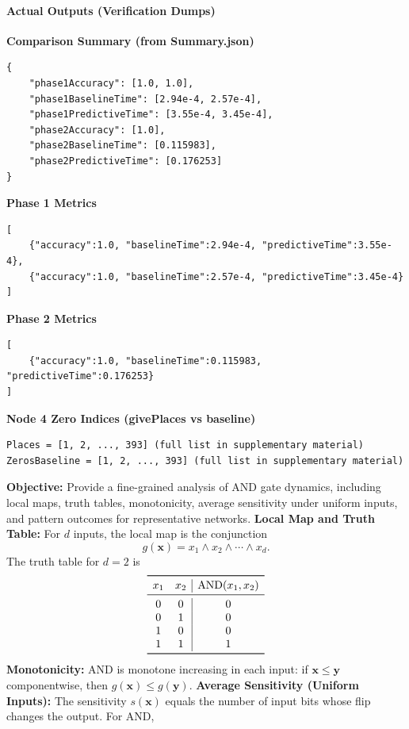 \paragraph{Actual Outputs (Verification Dumps)}
\textbf{Comparison Summary (from Summary.json)}
\begin{lstlisting}[language={},caption={Accuracy and timings for Phase 1 and Phase 2}]
{
    "phase1Accuracy": [1.0, 1.0],
    "phase1BaselineTime": [2.94e-4, 2.57e-4],
    "phase1PredictiveTime": [3.55e-4, 3.45e-4],
    "phase2Accuracy": [1.0],
    "phase2BaselineTime": [0.115983],
    "phase2PredictiveTime": [0.176253]
}
\end{lstlisting}
\textbf{Phase 1 Metrics}
\begin{lstlisting}[language={}]
[
    {"accuracy":1.0, "baselineTime":2.94e-4, "predictiveTime":3.55e-4},
    {"accuracy":1.0, "baselineTime":2.57e-4, "predictiveTime":3.45e-4}
]
\end{lstlisting}
\textbf{Phase 2 Metrics}
\begin{lstlisting}[language={}]
[
    {"accuracy":1.0, "baselineTime":0.115983, "predictiveTime":0.176253}
]
\end{lstlisting}
\textbf{Node 4 Zero Indices (givePlaces vs baseline)}
\begin{lstlisting}[language={},caption={Places (Predictive) equals ZerosBaseline (Exhaustive)}]
Places = [1, 2, ..., 393] (full list in supplementary material)
ZerosBaseline = [1, 2, ..., 393] (full list in supplementary material)
\end{lstlisting}
\textbf{Objective:} Provide a fine-grained analysis of AND gate dynamics, including local maps, truth tables, monotonicity, average sensitivity under uniform inputs, and pattern outcomes for representative networks.
\textbf{Local Map and Truth Table:} For \(d\) inputs, the local map is the conjunction
\[
g(\mathbf{x}) = x_1 \land x_2 \land \cdots \land x_d.
\]
The truth table for \(d=2\) is
\[
\begin{array}{cc|c}
\toprule
 x_1 & x_2 & \mathrm{AND}(x_1,x_2) \\
\midrule
 0 & 0 & 0 \\
 0 & 1 & 0 \\
 1 & 0 & 0 \\
 1 & 1 & 1 \\
\bottomrule
\end{array}
\]
\textbf{Monotonicity:} AND is monotone increasing in each input: if \(\mathbf{x}\leq \mathbf{y}\) componentwise, then \(g(\mathbf{x})\leq g(\mathbf{y})\).
\textbf{Average Sensitivity (Uniform Inputs):} The sensitivity \(s(\mathbf{x})\) equals the number of input bits whose flip changes the output. For AND,
